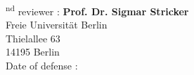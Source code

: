 \begin{supervisorpage}
\vspace{20pt} %

\textsuperscript{nd} reviewer : \textbf{Prof. Dr. Sigmar Stricker}\\
\hspace*{5.8em}Freie Universität Berlin\\
\hspace*{5.8em}Thielallee 63\\
\hspace*{5.8em}14195 Berlin\\



\vspace{2cm} %
Date of defense :

\end{supervisorpage}